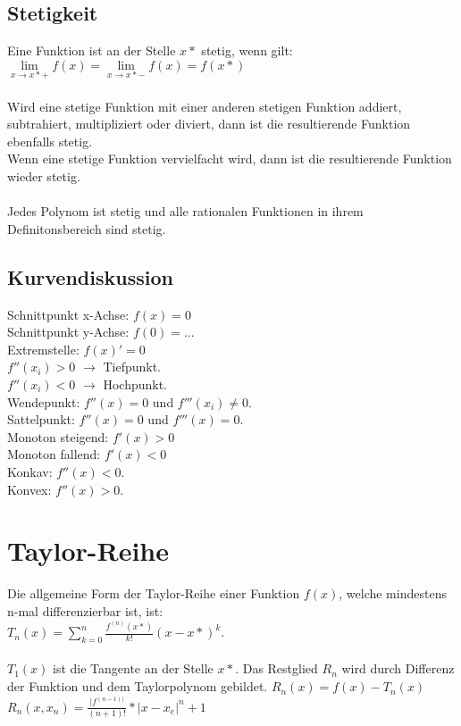 \documentclass[a4paper,landscape, 11pt]{article}
\newcommand{\limFromTo}[2]{ \lim\limits_{#2 \rightarrow #1}}
\begin{document}
\begin{multicols}{4}
\begin{small}
              \subsection{Stetigkeit}
                  Eine Funktion ist an der Stelle $x*$ stetig, wenn gilt:\\
                  $\limFromTo{x*+}{x} f(x) = \limFromTo{x*-}{x} f(x) = f(x*)$
                  \\ \\
                  Wird eine stetige Funktion mit einer anderen stetigen Funktion addiert, subtrahiert, multipliziert oder diviert, dann ist die resultierende Funktion ebenfalls stetig.\\
                  Wenn eine stetige Funktion vervielfacht wird, dann ist die resultierende Funktion wieder stetig. \\
                  \\
                  Jedes Polynom ist stetig und alle rationalen Funktionen in ihrem Definitonsbereich sind stetig.
                                    
              \subsection{Kurvendiskussion}
                  Schnittpunkt x-Achse: $f(x) = 0$ \\
                  Schnittpunkt y-Achse:  $f(0) = ...$\\
                  Extremstelle: $f(x)' = 0$  \\
                  $f''(x_i) > 0$ $\rightarrow$ Tiefpunkt.\\
                  $f''(x_i) < 0$ $\rightarrow$ Hochpunkt. \\
                  Wendepunkt: $f''(x) = 0$ und $f'''(x_i) \neq 0$. \\
                  Sattelpunkt: $f''(x) = 0$ und $f'''(x) = 0$. \\
                  Monoton steigend: $f'(x) > 0$ \\
                  Monoton fallend: $f'(x) < 0$ \\
                  Konkav: $f''(x) < 0$.\\
                  Konvex: $f''(x) > 0$.
                   	 
    \section{Taylor-Reihe}
        Die allgemeine Form der Taylor-Reihe einer Funktion $f(x)$, welche mindestens n-mal differenzierbar ist, ist: \\
        $T_n(x) = \sum_{k=0}^{n} \frac{f^{(n)}(x*)}{k!}(x - x*)^k$.
        \\ \\
        $T_1(x)$ ist die Tangente an der Stelle $x*$.
        Das Restglied $R_n$ wird durch Differenz der Funktion und dem Taylorpolynom gebildet. $R_n(x) = f(x) - T_n(x)$
        $R_n(x,x_n) = \frac{|f^{(n-1)|}}{(n+1)!}*|x-x_e|^n+1 $
        

\end{small}
\end{multicols}
\end{document}
